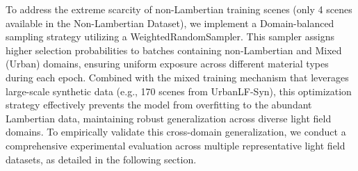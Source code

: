 To address the extreme scarcity of non-Lambertian training scenes (only 4 scenes available in the Non-Lambertian Dataset), we implement a Domain-balanced sampling strategy utilizing a WeightedRandomSampler. This sampler assigns higher selection probabilities to batches containing non-Lambertian and Mixed (Urban) domains, ensuring uniform exposure across different material types during each epoch. Combined with the mixed training mechanism that leverages large-scale synthetic data (e.g., 170 scenes from UrbanLF-Syn), this optimization strategy effectively prevents the model from overfitting to the abundant Lambertian data, maintaining robust generalization across diverse light field domains. To empirically validate this cross-domain generalization, we conduct a comprehensive experimental evaluation across multiple representative light field datasets, as detailed in the following section.